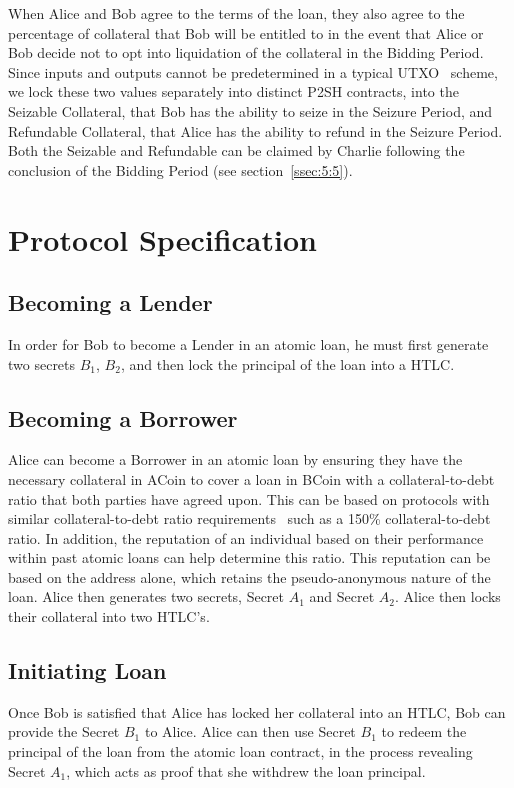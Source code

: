 \documentclass{llncs}
\begin{document}
When Alice and Bob agree to the terms of the loan, they also agree to the percentage of collateral that Bob will be entitled to in the event that Alice or Bob decide not to opt into liquidation of the collateral in the Bidding Period. Since inputs and outputs cannot be predetermined in a typical UTXO~\cite{ref_article11} scheme, we lock these two values separately into distinct P2SH contracts, into the Seizable Collateral, that Bob has the ability to seize in the Seizure Period, and Refundable Collateral, that Alice has the ability to refund in the Seizure Period. Both the Seizable and Refundable can be claimed by Charlie following the conclusion of the Bidding Period (see section~\ref{ssec:5:5}).

\section{Protocol Specification}

\subsection{Becoming a Lender}
In order for Bob to become a Lender in an atomic loan, he must first generate two secrets $B_1$, $B_2$, and then lock the principal of the loan into a HTLC. 

\subsection{Becoming a Borrower}
Alice can become a Borrower in an atomic loan by ensuring they have the necessary collateral in ACoin to cover a loan in BCoin with a collateral-to-debt ratio that both parties have agreed upon. This can be based on protocols with similar collateral-to-debt ratio requirements~\cite{ref_article12} such as a 150\% collateral-to-debt ratio. In addition, the reputation of an individual based on their performance within past atomic loans can help determine this ratio. This reputation can be based on the address alone, which retains the pseudo-anonymous nature of the loan. Alice then generates two secrets, Secret $A_1$ and Secret $A_2$. Alice then locks their collateral into two HTLC's.

\subsection{Initiating Loan}
Once Bob is satisfied that Alice has locked her collateral into an HTLC, Bob can provide the Secret $B_1$ to Alice. Alice can then use Secret $B_1$ to redeem the principal of the loan from the atomic loan contract, in the process revealing Secret $A_1$, which acts as proof that she withdrew the loan principal.  
\end{document}
